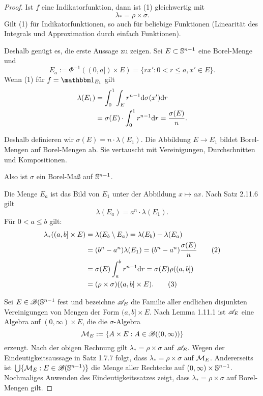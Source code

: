 \begin{proof}
  Ist $f$ eine Indikatorfunktion, dann ist (1) gleichwertig mit
  \[ \lambda_* = \rho \times \sigma. \]
  Gilt (1) für Indikatorfunktionen, so auch für beliebige Funktionen
  (Linearität des Integrals und Approximation durch einfach Funktionen).

  Deshalb genügt es, die erste Aussage zu zeigen. Sei $E \subset \mathbb{S}^{n-1}$
  eine Borel-Menge und
  \[ E_a := \Phi^{-1} ((0,a]) \times E) = \{ rx' : 0 < r \le a, x' \in E \}. \]
  Wenn (1) für $f = \ind_{E_1}$ gilt
  \begin{align*}
    \lambda(E_1) &= \int_0^1 \int_E r^{n-1} \mathrm{d} \sigma(x') \mathrm{d} r \\
                 &= \sigma(E) \cdot \int_0^1 r^{n-1} \mathrm{d} r = \frac{\sigma(E)}{n}.
  \end{align*}
  
  Deshalb definieren wir $\sigma(E) = n \cdot \lambda(E_1)$. Die Abbildung $E
  \to E_1$ bildet Borel-Mengen auf Borel-Mengen ab. Sie vertauscht mit
  Vereinigungen, Durchschnitten und Kompositionen.

  Also ist $\sigma$ ein Borel-Maß auf $\mathbb{S}^{n-1}$.

  Die Menge $E_a$ ist das Bild von $E_1$ unter der Abbildung $x \mapsto ax$.
  Nach Satz 2.11.6 gilt
  \[ \lambda(E_a) = a^n \cdot \lambda(E_1). \]
  Für $0 < a \le b$ gilt:
  \begin{align*}
    \lambda_*( (a,b] \times E )
    &= \lambda (E_b \setminus E_a) = \lambda(E_b) - \lambda(E_a) \\
    &= (b^n - a^n) \lambda(E_1) = (b^n - a^n) \frac{\sigma(E)}{n} \tag{2} \\
    &= \sigma(E) \int_a^b r^{n-1} \mathrm{d} r = \sigma(E) \rho((a,b]) \\
    &= (\rho \times \sigma) ((a,b] \times E). \tag{3}
  \end{align*}

  Sei $E \in \mathscr{B}(\mathbb{S}^{n-1}$ fest und bezeichne $\mathscr{A}_E$ die Familie aller
  endlichen disjunkten Vereinigungen von Mengen der Form $(a,b] \times E$. Nach
  Lemma 1.11.1 ist $\mathscr{A}_E$ eine Algebra auf $(0,\infty) \times E$, die die
  $\sigma$-Algebra
  \[ \mathcal{M}_E := \{ A \times E : A \in \mathscr{B}((0,\infty)) \} \]
  erzeugt. Nach der obigen Rechnung gilt $\lambda_* = \rho \times \sigma$ auf
  $\mathscr{A}_E$. Wegen der Eindeutigkeitsaussage in Satz 1.7.7 folgt, dass $\lambda_*
  = \rho \times \sigma$ auf $\mathcal{M}_E$. Andererseits ist $\bigcup\{\mathcal{M}_E:E \in
  \mathscr{B}(\mathbb{S}^{n-1})\}$ die Menge aller Rechtecke auf $(0,\infty) \times
  \mathbb{S}^{n-1}$. Nochmaliges Anwenden des Eindeutigkeitssatzes zeigt, dass
  $\lambda_* = \rho \times \sigma$ auf Borel-Mengen gilt.
\end{proof}

